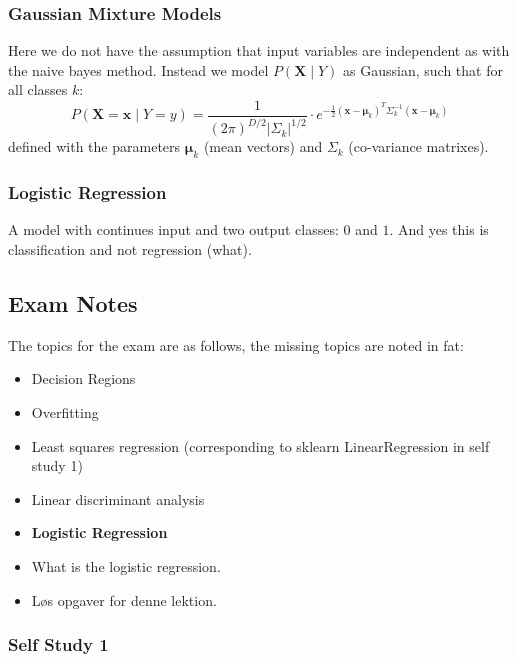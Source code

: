 \subsubsection{Gaussian Mixture Models}

Here we do not have the assumption that input variables are independent as with the naive bayes method.
Instead we model $P(\mathbf{X} \mid Y)$ as Gaussian, such that for all classes $k$:
\[
    P(\mathbf{X} = \mathbf{x} \mid Y = y) = \frac 1 {(2\pi)^{D / 2} | \Sigma_k |^{1 / 2}} \cdot e^{-\frac 1 2 (\mathbf{x} - \mathbf{\mu}_k)^T \Sigma_k^{-1}(\mathbf{x} - \mathbf{\mu}_k)}
\]
defined with the parameters $\mathbf{\mu}_k$ (mean vectors) and $\Sigma_k$ (co-variance matrixes).

\subsubsection{Logistic Regression}

A model with continues input and two output classes: $0$ and $1$.
And yes this is classification and not regression (what).

\subsection{Exam Notes}

The topics for the exam are as follows, the missing topics are noted in fat:
\begin{itemize}
    \item Decision Regions
    \item Overfitting
    \item Least squares regression (corresponding to sklearn LinearRegression in self study 1)
    \item Linear discriminant analysis
    \item \textbf{Logistic Regression}
\end{itemize}

\begin{mdframed}[nobreak,frametitle={Questions that Need Answering}]
    \begin{itemize}
        \item What is the logistic regression.
        \item Løs opgaver for denne lektion.
    \end{itemize}
\end{mdframed}

\subsubsection{Self Study 1}

